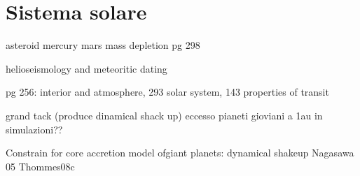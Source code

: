 {\let\clearpage\relax\let\cleardoublepage\relax
\chapter{Sistema solare}
}


\begin{workout}
asteroid mercury mars mass depletion pg 298
\end{workout}

\begin{workout}
helioseismology and meteoritic dating
\end{workout}


\begin{workout}
pg 256: interior and atmosphere, 293 solar system, 143 properties of transit
\end{workout}

\begin{workout}

\end{workout}

\begin{workout}

\end{workout}

\begin{workout}\end{workout}
grand tack (produce dinamical shack up) 
eccesso pianeti gioviani a 1au in simulazioni??
\begin{workout}

\end{workout}


\begin{workout}
Constrain for core accretion model ofgiant planets: dynamical shakeup Nagasawa 05 Thommes08c
\end{workout}


\begin{workout}

\end{workout}



